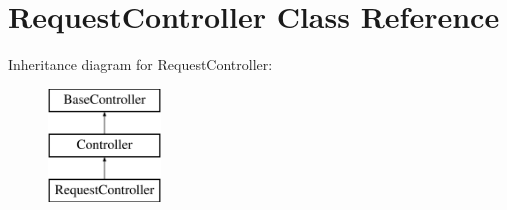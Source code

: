 \hypertarget{class_responsive_1_1_http_1_1_controllers_1_1_request_controller}{}\section{Request\+Controller Class Reference}
\label{class_responsive_1_1_http_1_1_controllers_1_1_request_controller}
Inheritance diagram for Request\+Controller\+:\begin{figure}[H]
\begin{center}
\leavevmode
\includegraphics[height=3.000000cm]{class_responsive_1_1_http_1_1_controllers_1_1_request_controller}
\end{center}
\end{figure}
